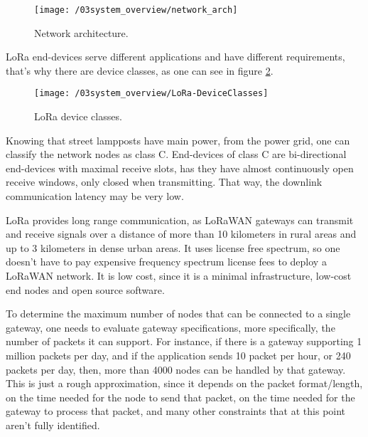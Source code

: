 \begin{figure}[ht]
	\centering
	\texttt{[image: /03system\_overview/network\_arch]}
	\caption{Network architecture.}
	\label{fig:network_arch}
\end{figure}

LoRa end-devices serve different applications and have different requirements, that's why there are device classes, as one can see in figure \ref{fig:lora_device_classes}.

\begin{figure}[H]
	\centering
	\texttt{[image: /03system\_overview/LoRa-DeviceClasses]}
	\caption{LoRa device classes.}
	\label{fig:lora_device_classes}
\end{figure}

Knowing that street lampposts have main power, from the power grid, one can classify the network nodes as class C. End-devices of class C are bi-directional end-devices with maximal receive slots, has they have almost continuously open receive windows, only closed when transmitting. That way, the downlink communication latency may be very low. \cite{what_is_lorawan}

LoRa provides long range communication, as LoRaWAN gateways can transmit and receive signals over a distance of more than 10 kilometers in rural areas and up to 3 kilometers in dense urban areas. It uses license free spectrum, so one doesn't have to pay expensive frequency spectrum license fees to deploy a LoRaWAN network. It is low cost, since it is a minimal infrastructure, low-cost end nodes and open source software. 

To determine the maximum number of nodes that can be connected to a single gateway, one needs to evaluate gateway specifications, more specifically, the number of packets it can support. For instance, if there is a gateway supporting 1 million packets per day, and if the application sends 10 packet per hour, or 240 packets per day, then, more than 4000 nodes can be handled by that gateway. This is just a rough approximation, since it depends on the packet format/length, on the time needed for the node to send that packet, on the time needed for the gateway to process that packet, and many other constraints that at this point aren't fully identified.



